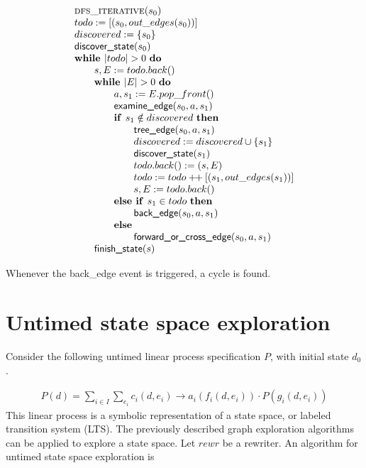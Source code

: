 \documentclass{article}
\newcommand{\concat}{\ensuremath{+\!\!+\:}}
\newcommand{\Space}{\text{\ }}
\newcommand{\If}{\text{\textbf{if }}}
\newcommand{\Do}{\text{\textbf{do }}}
\newcommand{\Then}{\text{\textbf{then }}}
\newcommand{\Else}{\text{\textbf{else }}}
\newcommand{\While}{\text{\textbf{while }}}
\begin{document}
\[
\begin{tabular}{l}
\textsc{dfs\_iterative}($s_0$) \\
$todo := [(s_0, out\_edges(s_0))]$ \\
$discovered := \{ s_0 \}$ \\
$\textsf{discover\_state}(s_0)$ \\
$\While |todo| > 0 \Space \Do$ \\
\qquad $s, E := todo.back()$ \\
\qquad $\While |E| > 0 \Space \Do$ \\
\qquad \qquad $a, s_1 := E.pop\_front()$ \\
\qquad \qquad $\textsf{examine\_edge}(s_0, a, s_1)$ \\
\qquad \qquad $\If s_1 \notin discovered \Space \Then$ \\
\qquad \qquad \qquad $\textsf{tree\_edge}(s_0, a, s_1)$ \\
\qquad \qquad \qquad $discovered := discovered \cup \{ s_1 \}$ \\
\qquad \qquad \qquad $\textsf{discover\_state}(s_1)$ \\
\qquad \qquad \qquad $todo.back() := (s, E)$ \\
\qquad \qquad \qquad $todo := todo \concat [(s_1, out\_edges(s_1))]$ \\
\qquad \qquad \qquad $s, E := todo.back()$ \\
\qquad \qquad $\Else \If s_1 \in todo \Space \Then$ \\
\qquad \qquad \qquad $\textsf{back\_edge}(s_0, a, s_1)$ \\
\qquad \qquad \Else \\
\qquad \qquad \qquad $\textsf{forward\_or\_cross\_edge}(s_0, a, s_1)$ \\
\qquad $\textsf{finish\_state}(s)$ \\
\end{tabular}
\]

Whenever the \textsf{back\_edge} event is triggered, a cycle is found.

\newpage
\section{Untimed state space exploration}
Consider the following untimed linear process specification $P$, with initial state $d_0$. 

\[
\begin{array}{l}
P(d)=
\sum\limits_{i\in I}\sum\limits_{e_i}c_i(d, e_i)\rightarrow a_i(f_i(d,e_i)) \cdot P(g_i(d,e_i))
\end{array}
\]
This linear process is a symbolic representation of a state space, or labeled transition system
(LTS). The previously described graph exploration algorithms can be applied to explore a
state space. Let $rewr$ be a rewriter. An algorithm for untimed state space exploration is 
\end{document}
